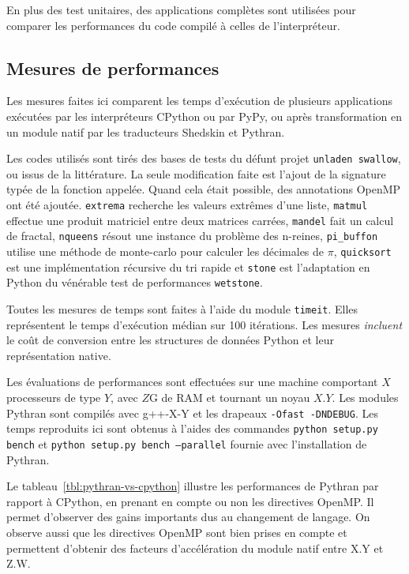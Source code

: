 \documentclass[renpar]{compas2013}
\begin{document}
En plus des test unitaires, des applications complètes sont utilisées pour
comparer les performances du code compilé à celles de l'interpréteur.

\subsection{Mesures de performances}

Les mesures faites ici comparent les temps d'exécution de plusieurs
applications exécutées par les interpréteurs CPython ou par PyPy, ou après
transformation en un module natif par les traducteurs Shedskin et Pythran.

Les codes utilisés sont tirés des bases de tests du défunt projet
\texttt{unladen swallow}, ou issus de la littérature. La seule
modification faite est l'ajout de la signature typée de la fonction
appelée. Quand cela était possible, des annotations OpenMP ont été
ajoutée. \texttt{extrema} recherche les valeurs extrêmes d'une liste,
\texttt{matmul} effectue une produit matriciel entre deux matrices
carrées, \texttt{mandel} fait un calcul de fractal, \texttt{nqueens}
résout une instance du problème des n-reines, \texttt{pi\_buffon} utilise
une méthode de monte-carlo pour calculer les décimales de $\pi$,
\texttt{quicksort} est une implémentation récursive du tri rapide et
\texttt{stone} est l'adaptation en Python du vénérable test de
performances \texttt{wetstone}.

Toutes les mesures de temps sont faites à l'aide du module
\texttt{timeit}. Elles représentent le temps d'exécution médian sur 100
itérations. Les mesures \emph{incluent} le coût de conversion entre les
structures de données Python et leur représentation native.

Les évaluations de performances sont effectuées sur une machine comportant
$X$ processeurs de type $Y$, avec $Z$G de RAM et tournant un noyau $X.Y$.
Les modules Pythran sont compilés avec g++-X-Y et les drapeaux
\texttt{-Ofast -DNDEBUG}.
Les temps reproduits ici sont obtenus à l'aides des commandes
\texttt{python setup.py bench} et \texttt{python setup.py bench
--parallel} fournie avec l'installation de Pythran.

Le tableau~\ref{tbl:pythran-vs-cpython} illustre les performances de
Pythran par rapport à CPython, en prenant en compte ou non les directives
OpenMP. Il permet d'observer des gains importants dus au changement de
langage. On observe aussi que les directives OpenMP sont bien prises en
compte et permettent d'obtenir des facteurs d'accélération du module natif
entre X.Y et Z.W.
\end{document}
